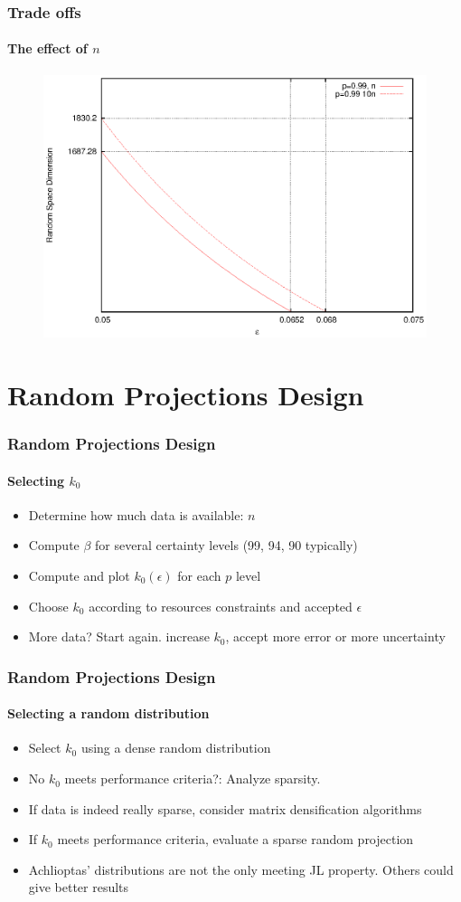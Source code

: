 \documentclass{beamer}
\begin{document}
\begin{frame}
\frametitle{Trade offs}
\framesubtitle{The effect of $n$}
 		\begin{figure}
		\includegraphics[scale=0.88]{tradeoffs3.eps}
	\end{figure}
\end{frame}

\section{Random Projections Design}

\begin{frame}
\frametitle{Random Projections Design}
\framesubtitle{Selecting $k_{0}$}

\begin{itemize}
  \item Determine how much data is available: $n$
  \item Compute $\beta$ for several certainty levels (99, 94, 90 typically)
  \item Compute and plot $k_{0}(\epsilon)$ for each $p$ level
  \item Choose $k_{0}$ according to resources constraints and accepted $\epsilon$
  \item More data? Start again. increase $k_{0}$, accept more error or more uncertainty
\end{itemize}
\end{frame} 


\begin{frame}
\frametitle{Random Projections Design}
\framesubtitle{Selecting a random distribution}

\begin{itemize}
  \item Select $k_{0}$ using a dense random distribution
  \item No $k_{0}$ meets performance criteria?: Analyze sparsity.
  \item If data is indeed really sparse, consider matrix densification algorithms
  \item If $k_{0}$ meets performance criteria, evaluate a sparse random projection
  \item Achlioptas' distributions are not the only meeting JL property. Others could give better results
\end{itemize}
\end{frame} 
\end{document}
